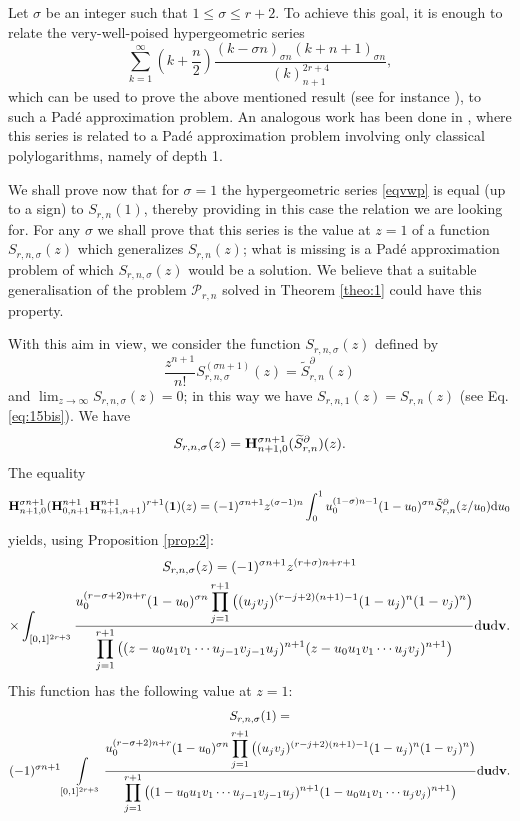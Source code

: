 \documentclass[reqno,12pt]{amsart}
\numberwithin{equation}{section}
\theoremstyle{remark}
\def\dd{\textup{d}}
\newcommand{\BBB}{{\bf H}}
\newcommand{\opb}{\BBB^{n+1}_{0,n+1}\BBB^{n+1}_{n+1,n+1}}
\newcommand{\Prn}{\mathcal{P}_{r,n}}
\begin{document}
Let $\sigma$ be an integer such that $1 \leq \sigma \leq r+2$. To achieve this goal, it is 
enough to relate the very-well-poised hypergeometric series 
\begin{equation} \label{eqvwp}
\sum_{k=1}^{\infty} (k+\frac{n}2) \frac{(k-\sigma n)_{\sigma n} (k+n+1) _{\sigma n}}{(k)_{n+1}^{2r+4}},
\end{equation}
which can be used to prove the above mentioned result (see for instance \cite{fischler3}), 
to such a Pad\'e approximation problem. An analogous work has been done in \cite{firi}, where this 
series is related to a Pad\'e approximation problem involving only classical polylogarithms, namely of depth 1. 

We shall prove now that for $\sigma =1$ the  hypergeometric series  \eqref{eqvwp} is equal (up to a sign) 
to $S_{r,n}(1)$, thereby providing in this case the relation we are looking for. For any $\sigma$ we shall 
prove that this series is the value at $z=1$ of a function $S_{r,n,\sigma}(z)$ which generalizes  
$S_{r,n }(z)$; what is missing  is a Pad\'e approximation problem 
of which $S_{r,n,\sigma}(z)$  would be  a solution. We believe that a suitable generalisation of the problem  
$\Prn$ solved in Theorem \ref{theo:1} could have this property.

\bigskip

With this aim in view, we  consider the function $S_{r,n,\sigma}(z)$ defined by
$$
\frac{z^{n+1}}{n!}S_{r,n,\sigma}^{(\sigma n+1)}(z) = \tilde{S}_{r,n}^{\partial}(z)
$$
and  $\lim_{z\to \infty} S_{r,n,\sigma} (z)=0$; in this way we have $S_{r,n,1}(z)  =  S_{r,n }(z)$ 
(see Eq. \eqref{eq:15bis}).   We have
$$
S_{r,n,\sigma}(z)=\BBB^{\sigma n+1}_{n+1,0} (\widetilde{S}_{r,n}^{\partial})(z).
$$
The equality
$$
\BBB^{\sigma n+1}_{n+1,0} (\opb)^{r+1} (\boldsymbol{1})(z)  = 
(-1)^{\sigma n+1}z^{(\sigma - 1)  n } \int_0^1 u_0^{(1-\sigma)n-1}(1-u_0)^{\sigma n} \tilde{S}_{r,n}^{\partial}(z/u_0) \dd u_0
$$
yields, using Proposition \ref{prop:2}:
\begin{multline*}
S_{r,n,\sigma}(z)=(-1)^{\sigma n+1}z^{(r+\sigma)  n+r+1} \\
\times \int_{[0,1]^{2r+3}} 
\frac{\displaystyle u_0^{(r-\sigma+2) n+r}(1-u_0)^{\sigma n} 
\prod_{j=1}^{r+1}\big((u_jv_j)^{(r-j+2)(n+1)-1}(1-u_j)^n(1-v_j)^n\big)}
{\displaystyle \prod_{j=1}^{r+1}\big((z-u_0u_1v_1\cdots u_{j-1}v_{j-1}u_j)^{n+1}
(z-u_0u_1v_1\cdots u_{j}v_{j})^{n+1}\big)} \dd{\bf u}\dd{\bf v}.
\end{multline*}
This function has the following value at $z=1$:
\begin{multline*}
S_{r,n,\sigma}(1) = 
\\ (-1)^{\sigma n+1}  \int\limits_{[0,1]^{2r+3}} 
\frac{\displaystyle u_0^{(r-\sigma+2) n+r}(1-u_0)^{\sigma n} \prod_{j=1}^{r+1}\big((u_jv_j)^{(r-j+2)(n+1)-1}(1-u_j)^n(1-v_j)^n\big)}
{\displaystyle \prod_{j=1}^{r+1}
\big((1-u_0u_1v_1\cdots u_{j-1}v_{j-1}u_j)^{n+1}(1-u_0u_1v_1\cdots u_{j}v_{j})^{n+1}\big)} \dd{\bf u}\dd{\bf v}.
\end{multline*}
\end{document}
